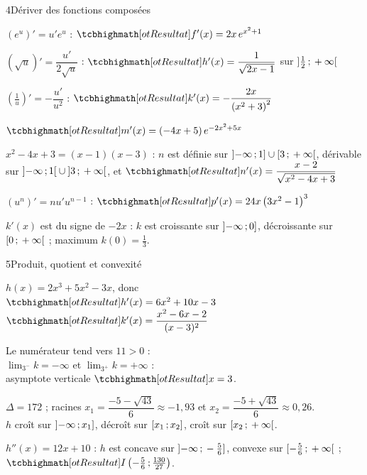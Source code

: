 \begin{deuxcolonnes}
\begin{corrige}{4}{Dériver des fonctions composées}
\begin{questions}
  \item \begin{questions}
      \item $\left(e^{u}\right)'=u'e^{u}$ : $\res{f'(x)=2x\,e^{x^{2}+1}}$
      \item $\left(\sqrt u\right)'=\dfrac{u'}{2\sqrt u}$ : $\res{h'(x)=\dfrac{1}{\sqrt{2x-1}}}$ sur $\mathopen{]}\frac12\,{;}\,+\infty\mathclose{[}$
      \item $\left(\frac1u\right)'=-\dfrac{u'}{u^{2}}$ : $\res{k'(x)=-\dfrac{2x}{\left(x^{2}+3\right)^{2}}}$
      \item $\res{m'(x)=(-4x+5)\,e^{-2x^{2}+5x}}$
      \item $x^{2}-4x+3=(x-1)(x-3)$ : $n$ est définie sur $\mathopen{]}-\infty\,{;}\,1\mathclose{]}\cup\mathopen{[}3\,{;}\,+\infty\mathclose{[}$, dérivable sur
        $\mathopen{]}-\infty\,{;}\,1\mathclose{[}\cup\mathopen{]}3\,{;}\,+\infty\mathclose{[}$, et $\res{n'(x)=\dfrac{x-2}{\sqrt{x^{2}-4x+3}}}$
      \item $\left(u^{n}\right)'=nu'u^{n-1}$ : $\res{p'(x)=24x\left(3x^{2}-1\right)^{3}}$
    \end{questions}
  \item $k'(x)$ est du signe de $-2x$ : $k$ est croissante sur $\mathopen{]}-\infty\,{;}\,0\mathclose{]}$, décroissante sur
    $\mathopen{[}0\,{;}\,+\infty\mathclose{[}$ ; maximum $k(0)=\frac13$.
\end{questions}
\end{corrige}

\begin{corrige}{5}{Produit, quotient et convexité}
\begin{questions}
  \item $h(x)=2x^{3}+5x^{2}-3x$, donc\\ $\res{h'(x)=6x^{2}+10x-3}$\\[1mm]
    $\res{k'(x)=\dfrac{x^{2}-6x-2}{(x-3)^{2}}}$
  \item Le numérateur tend vers $11>0$ :\\ $\lim_{3^{-}}k=-\infty$ et $\lim_{3^{+}}k=+\infty$ :\\
    asymptote verticale $\res{x=3}$.
  \item $\Delta=172$ ; racines $x_{1}=\dfrac{-5-\sqrt{43}}{6}\approx-1{,}93$ et $x_{2}=\dfrac{-5+\sqrt{43}}{6}\approx0{,}26$.\\
    $h$ croît sur $\mathopen{]}-\infty\,{;}\,x_{1}\mathclose{]}$, décroît sur $\mathopen{[}x_{1}\,{;}\,x_{2}\mathclose{]}$, croît sur $\mathopen{[}x_{2}\,{;}\,+\infty\mathclose{[}$.
  \item $h''(x)=12x+10$ : $h$ est concave sur $\mathopen{]}-\infty\,{;}\,-\frac56\mathclose{]}$, convexe sur $\mathopen{[}-\frac56\,{;}\,+\infty\mathclose{[}$ ;
    $\res{I\left(-\frac56\pv\frac{130}{27}\right)}$.
\end{questions}
\end{corrige}


\end{deuxcolonnes}
